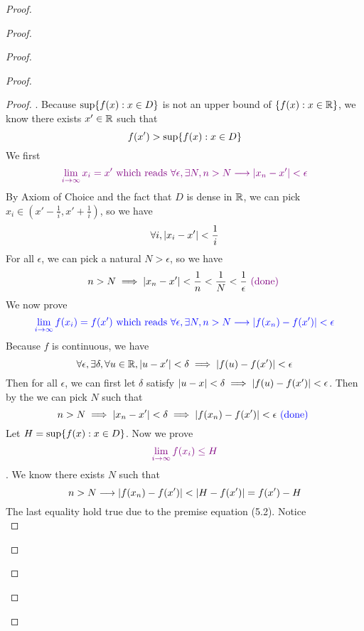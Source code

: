 \documentclass{report}
\begin{document}
\begin{proof}
\begin{proof}
\begin{proof}
\begin{proof}
\begin{proof}
. Because $\sup \{ f(x):x\in D \}$ is not an upper bound of $\{ f(x):x\in \mathbb{R} \}$, we know there exists $x'\in \mathbb{R}$ such that 
\begin{equation}
f(x')>\sup \{ f(x):x\in D \}
\end{equation}
We first  
\begin{equation}
  \textcolor{violet}{\lim_{i\to \infty}x_i=x'\text{ which reads } \forall \epsilon, \exists N, n>N \longrightarrow |x_n - x'|<\epsilon}
\end{equation}
By Axiom of Choice and the fact that $D$ is dense in  $\mathbb{R}$, we can pick $x_i \in (x'- \frac{1}{i},x' +\frac{1}{i})$, so we have
\begin{equation}
\forall i, |x_i-x'|<\frac{1}{i}
\end{equation}
For all $\epsilon $, we can pick a natural $N>\epsilon $, so we have 
\begin{equation}
n>N\implies |x_n-x'|<\frac{1}{n}<\frac{1}{N}<\frac{1}{\epsilon }\textcolor{violet}{\text{ (done) }}
\end{equation}
We now prove 
\begin{equation}
\textcolor{blue}{\lim_{i\to\infty}f(x_i)=f(x')\text{ which reads }\forall \epsilon , \exists N, n>N\longrightarrow  |f(x_n)-f(x')|<\epsilon }
\end{equation}
Because $f$ is continuous, we have 
\begin{equation}
  \forall \epsilon ,\exists \delta, \forall u\in \mathbb{R}, |u-x'|<\delta\implies |f(u)-f(x')|<\epsilon  
\end{equation}
Then for all $\epsilon $, we can first let $\delta$ satisfy $|u-x|<\delta \implies |f(u)-f(x')|<\epsilon $. Then by the  we can pick $N$ such that 
\begin{equation}
n>N\implies |x_n - x'|< \delta \implies |f(x_n)-f(x')|<\epsilon \textcolor{blue}{\text{ (done) }} 
\end{equation}
Let $H=\sup \{ f(x): x\in D \}$. Now we prove  
\begin{equation}
  \textcolor{violet}{\lim_{i \to \infty}f(x_i)\leq H}
\end{equation}
. We know there exists $N$ such that 
\begin{equation}
n>N\longrightarrow \abso{f(x_n)-f(x')}<\abso{H - f(x') }=f(x')-H
\end{equation}
The last equality hold true due to the premise equation (5.2). Notice 
\begin{equation}

\end{equation}
\end{proof}
\end{proof}
\end{proof}
\end{proof}
\end{proof}
\end{document}
